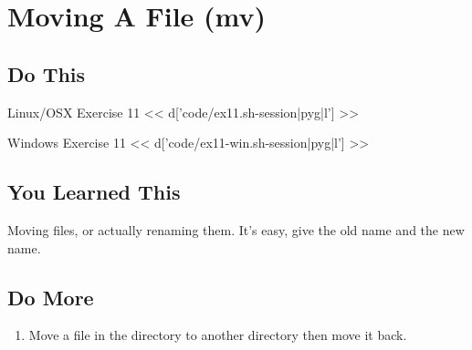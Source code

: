 \chapter{Moving A File (mv)}

\section{Do This}

\begin{code}{Linux/OSX Exercise 11}
<< d['code/ex11.sh-session|pyg|l'] >>
\end{code}

\begin{code}{Windows Exercise 11}
<< d['code/ex11-win.sh-session|pyg|l'] >>
\end{code}

\section{You Learned This}

Moving files, or actually renaming them.  It's easy, give the old name and
the new name.

\section{Do More}

\begin{enumerate}
\item Move a file in the  directory to another directory
    then move it back.
\end{enumerate}

